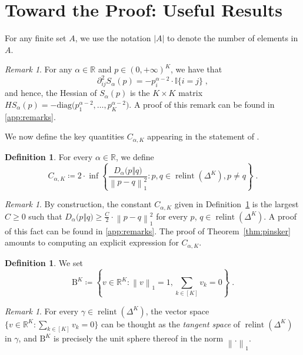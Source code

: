 \documentclass[11pt,oneside,a4paper]{article}
\newcommand{\I}{\mathbb{I}}
\newcommand{\R}{\mathbb{R}}
\newcommand{\lrb}[1]{\left(#1\right)}
\newcommand{\brb}[1]{\bigl(#1\bigr)}
\newcommand{\lcb}[1]{\left\{#1\right\}}
\newcommand{\lno}[1]{\left\lVert#1\right\rVert}
\theoremstyle{plain}
\theoremstyle{definition}
\newtheorem{definition}[theorem]{Definition}
\theoremstyle{remark}
\newtheorem{remark}[theorem]{Remark}
\newcommand{\simplex}[1]{\Delta^{#1}}
\DeclareMathOperator*{\relint}{relint}
\newcommand{\tsphere}[1]{\mathrm{B}^{#1}}
\begin{document}
\section{Toward the Proof: Useful Results}
For any finite set $A$, we use the notation $|A|$ to denote the number of elements in $A$.
\begin{remark}
\label{remark:hessian}
For any $\alpha \in \R$ and $p\in(0,+\infty)^K$, we have that
\[
    \partial^2_{ij} S_\alpha(p)
=
    - p_i^{\alpha-2} \cdot \I\{i = j\}\;,
\]
and hence, the Hessian of $S_\alpha(p)$ is the $K \times K$ matrix $HS_\alpha(p) = -\mathrm{diag}\brb{ p_1^{\alpha-2},\ldots, p_K^{\alpha-2}}$.
A proof of this remark can be found in \cref{app:remarks}.
\end{remark}
We now define the key quantities $C_{\alpha,K}$ appearing in the statement of .
\begin{definition}\label{def:const}
    For every $\alpha \in \R$, we define
    \begin{equation}\label{eq:sharp}    
        C_{\alpha, K}
    \coloneq
        2 \cdot  \inf \lcb{\frac{D_\alpha\brb{p\Vert q}}{\lno{p - q}_1^2} : p , q \in  \relint\lrb{\simplex{K}}, p \neq q}\;.
    \end{equation}
    \end{definition}
\begin{remark}\label{remark:const-is-best}
    By construction, the constant $C_{\alpha, K}$ given in Definition~\ref{def:const} is the largest $C \geq 0$ such that $D_\alpha\brb{p\Vert q} \ge \frac{C}{2} \cdot \lno{p - q}_1^2$ for every $p$, $q \in  \relint\lrb{\simplex{K}}$.
    A proof of this fact can be found in \cref{app:remarks}.
    The proof of Theorem~\ref{thm:pinsker} amounts to computing an explicit expression for $C_{\alpha, K}$.
\end{remark}
\begin{definition}
    We set
\begin{equation}\label{eq:1-sphere-section}
    \tsphere{K}
\coloneq
    \lcb{v \in \R^K :\lno{v}_1=1, \sum_{k\in[K]}v_k = 0}\;.
\end{equation}
\end{definition}
\begin{remark}    
    For every $\gamma \in \relint{\lrb{\simplex{K}}}$, the vector space $\{ v \in \R^K : \sum_{k \in [K]} v_k = 0\}$ can be thought as the \emph{tangent space} of $\relint{\lrb{\simplex{K}}}$ in $\gamma$, and $\tsphere{K}$ is precisely the unit sphere thereof in the norm $\lno{. }_1$.
\end{remark} 
\end{document}
